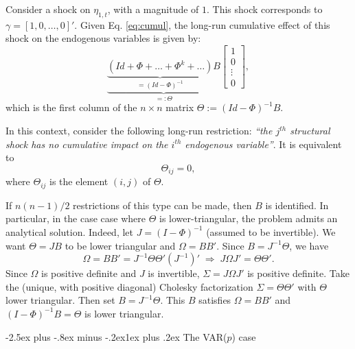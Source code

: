 \documentclass[
  11pt,
]{book}
\makeatletter
\renewcommand\subsection{\@startsection{subsection}{2}{\z@}
  {-2.5ex plus -.8ex minus -.2ex}{1ex plus .2ex}
  {\normalfont\large\bfseries\color{TextbookInk}}}
\theoremstyle{definition}
\theoremstyle{definition}
\theoremstyle{definition}
\theoremstyle{definition}
\theoremstyle{remark}
\makeatother
\begin{document}
Consider a shock on \(\eta_{1,t}\), with a magnitude of \(1\). This shock corresponds to \(\gamma = [1,0,\dots,0]'\). Given Eq. \eqref{eq:cumul}, the long-run cumulative effect of this shock on the endogenous variables is given by:
\[
\underbrace{\underbrace{(Id+\Phi+\ldots+\Phi^{k}+\ldots)}_{=(Id - \Phi)^{-1}}B}_{=: \Theta}\left[\begin{array}{c}
1\\
0\\
\vdots\\
0\end{array}\right],
\]
which is the first column of the \(n \times n\) matrix \(\Theta := (Id - \Phi)^{-1}B\).

In this context, consider the following long-run restriction: \emph{``the \(j^{th}\) structural shock has no cumulative impact on the \(i^{th}\) endogenous variable''}. It is equivalent to
\[
\Theta_{ij}=0,
\]
where \(\Theta_{ij}\) is the element \((i,j)\) of \(\Theta\).

If \(n(n-1)/2\) restrictions of this type can be made, then \(B\) is identified. In particular, in the case case where \(\Theta\) is lower-triangular, the problem admits an analytical solution. Indeed, let \(J = (I - \Phi)^{-1}\) (assumed to be invertible). We want \(\Theta = JB\) to be lower triangular and \(\Omega = BB'\). Since \(B = J^{-1} \Theta\), we have
\[
\Omega = BB' = J^{-1} \Theta \Theta' (J^{-1})' \;\Rightarrow\; J\Omega J' = \Theta \Theta'.
\]
Since \(\Omega\) is positive definite and \(J\) is invertible, \(\Sigma = J\Omega J'\) is positive definite. Take the (unique, with positive diagonal) Cholesky factorization \(\Sigma = \Theta \Theta'\) with \(\Theta\) lower triangular. Then set \(B = J^{-1} \Theta\). This \(B\) satisfies \(\Omega = BB'\) and \((I - \Phi)^{-1}B = \Theta\) is lower triangular.

\subsection{\texorpdfstring{The VAR(\(p\)) case}{The VAR(p) case}}\label{the-varp-case}
\end{document}
